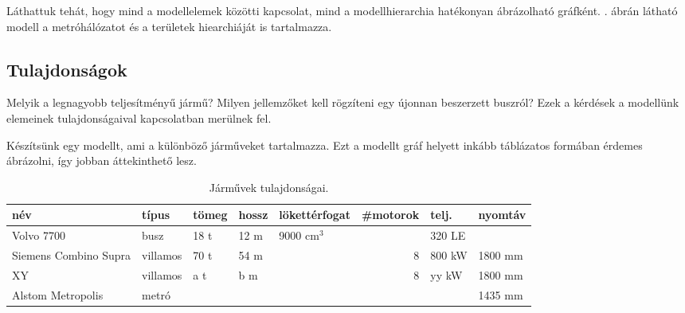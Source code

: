 %	
%	

Láthattuk tehát, hogy mind a modellelemek közötti kapcsolat, mind a modellhierarchia hatékonyan ábrázolható gráfként. . ábrán látható modell a metróhálózatot és a területek hiearchiáját is tartalmazza.


\subsection{Tulajdonságok}

\begin{pelda}
	Melyik a legnagyobb teljesítményű jármű? Milyen jellemzőket kell rögzíteni egy újonnan beszerzett buszról? Ezek a kérdések a modellünk elemeinek tulajdonságaival kapcsolatban merülnek fel.
\end{pelda}

Készítsünk egy modellt, ami a különböző járműveket tartalmazza. Ezt a modellt gráf helyett inkább táblázatos formában érdemes ábrázolni, így jobban áttekinthető lesz.

\begin{table}[H]
	\centering
	\begin{tabular}{|l|l|l|l|l|r|l|l|}
		\hline
		név                   & típus    & tömeg & hossz & lökettérfogat & \#motorok & telj. & nyomtáv \\ \hline\hline
		Volvo 7700            & busz     & 18 t  & 12 m  & 9000 cm$^3$   &               & 320 LE       &         \\ \hline
		Siemens Combino Supra & villamos & 70 t  & 54 m  &               & 8             & 800 kW       & 1800 mm \\ \hline
		XY & villamos & a t  & b m  &               & 8             & yy kW       & 1800 mm \\ \hline
		Alstom Metropolis     & metró    &       &       &               &               &              & 1435 mm \\ \hline
	\end{tabular}
	\caption{Járművek tulajdonságai.}
	\label{tab:jarmuvek}
\end{table}

